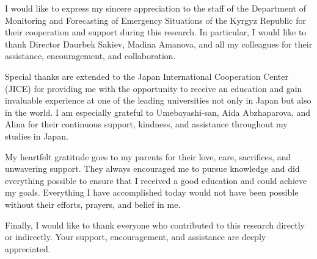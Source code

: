 \documentclass[12pt,a4paper]{report}
\begin{document}
I would like to express my sincere appreciation to the staff of the Department of Monitoring and Forecasting of Emergency Situations of the Kyrgyz Republic for their cooperation and support during this research. In particular, I would like to thank Director Daurbek Sakiev, Madina Amanova, and all my colleagues for their assistance, encouragement, and collaboration.

Special thanks are extended to the Japan International Cooperation Center (JICE) for providing me with the opportunity to receive an education and gain invaluable experience at one of the leading universities not only in Japan but also in the world. I am especially grateful to Umebayashi-san, Aida Abzhaparova, and Alina for their continuous support, kindness, and assistance throughout my studies in Japan.

My heartfelt gratitude goes to my parents for their love, care, sacrifices, and unwavering support. They always encouraged me to pursue knowledge and did everything possible to ensure that I received a good education and could achieve my goals. Everything I have accomplished today would not have been possible without their efforts, prayers, and belief in me.

Finally, I would like to thank everyone who contributed to this research directly or indirectly. Your support, encouragement, and assistance are deeply appreciated.
\end{document}
